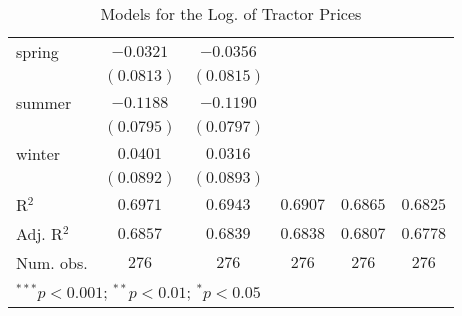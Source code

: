 \begin{table}
\begin{center}
\begin{tabular}{l c c c c c}
spring      & $-0.0321$       & $-0.0356$       &                 &                 &                 \\
            & $(0.0813)$      & $(0.0815)$      &                 &                 &                 \\
summer      & $-0.1188$       & $-0.1190$       &                 &                 &                 \\
            & $(0.0795)$      & $(0.0797)$      &                 &                 &                 \\
winter      & $0.0401$        & $0.0316$        &                 &                 &                 \\
            & $(0.0892)$      & $(0.0893)$      &                 &                 &                 \\
\hline
R$^2$       & $0.6971$        & $0.6943$        & $0.6907$        & $0.6865$        & $0.6825$        \\
Adj. R$^2$  & $0.6857$        & $0.6839$        & $0.6838$        & $0.6807$        & $0.6778$        \\
Num. obs.   & $276$           & $276$           & $276$           & $276$           & $276$           \\
\hline
\multicolumn{6}{l}{\scriptsize{$^{***}p<0.001$; $^{**}p<0.01$; $^{*}p<0.05$}}
\end{tabular}
\caption{Models for the Log. of Tractor Prices}
\label{tab:reg_reduction}
\end{center}
\end{table}
